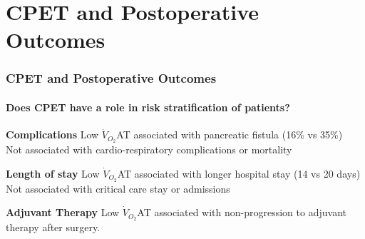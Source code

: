 \documentclass[10pt]{beamer}
\begin{document}
\section[Chapter 2]{CPET and Postoperative Outcomes}
\begin{frame}
	\frametitle{CPET and Postoperative Outcomes}
	\framesubtitle{Does CPET have a role in risk stratification of patients?}
	\begin{block}{\textbf{Complications}}
		Low $\dot{V}_{O_2}$AT associated with pancreatic fistula (16\% vs 35\%) \\
		Not associated with cardio-respiratory complications or mortality
	\end{block}
	
	\begin{block}{\textbf{Length of stay}}
		Low $\dot{V}_{O_2}$AT associated with longer hospital stay (14 vs 20 days)\\
		Not associated with critical care stay or admissions
	\end{block}
	
	\begin{block}{\textbf{Adjuvant Therapy}}
		Low $\dot{V}_{O_2}$AT associated with non-progression to adjuvant therapy after surgery.
	\end{block}
\end{frame}
\end{document}
